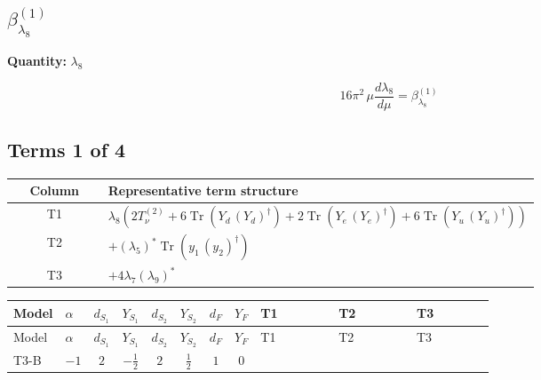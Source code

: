 \documentclass[8pt]{article}
\begin{document}
\begin{landscape}
\section*{$\beta_{\lambda_{8}}^{(1)}$}
\noindent\textbf{Quantity: }$\lambda_{8}$\par\smallskip
\[16\pi^2\,\mu\frac{d \lambda_{8}}{d\mu}=\beta_{\lambda_{8}}^{(1)}\]
\subsection*{Terms 1 of 4}
\begin{center}
\begin{tabular}{@{}c >{\raggedright\arraybackslash}p{0.82\linewidth}@{}}
\toprule
Column & Representative term structure \\
\midrule
T1 & \(\displaystyle {\lambda_{8}} (2 T_{\nu}^{(2)}+6 \operatorname{Tr}\!\left({Y_d}\,\left({Y_d}\right)^{\dagger}\right)+2 \operatorname{Tr}\!\left({Y_e}\,\left({Y_e}\right)^{\dagger}\right)+6 \operatorname{Tr}\!\left({Y_u}\,\left({Y_u}\right)^{\dagger}\right))\) \\
\midrule
T2 & \(\displaystyle +\left({\lambda_5}\right)^{*} \operatorname{Tr}\!\left({y_1}\,\left({y_2}\right)^{\dagger}\right)\) \\
\midrule
T3 & \(\displaystyle +4 {\lambda_{7}} \left({\lambda_{9}}\right)^{*}\) \\
\midrule
\bottomrule
\end{tabular}
\end{center}
\smallskip
\tiny
\begin{longtable}{@{}llcccccc >{\raggedright\arraybackslash}p{0.21\linewidth} >{\raggedright\arraybackslash}p{0.21\linewidth} >{\raggedright\arraybackslash}p{0.21\linewidth}@{}}
\toprule
Model & $\alpha$ & $d_{S_1}$ & $Y_{S_1}$ & $d_{S_2}$ & $Y_{S_2}$ & $d_F$ & $Y_F$ & T1 & T2 & T3 \\
\midrule
\endfirsthead
\toprule
Model & $\alpha$ & $d_{S_1}$ & $Y_{S_1}$ & $d_{S_2}$ & $Y_{S_2}$ & $d_F$ & $Y_F$ & T1 & T2 & T3 \\
\midrule
\endhead
T3-B & $-1$ & $2$ & $-\frac{1}{2}$ & $2$ & $\frac{1}{2}$ & $1$ & $0$ & \scriptsize\adjustbox{max width=\linewidth}{$\begin{gathered} {\lambda_{8}} (2 T_{\nu}^{(2)}+6 \operatorname{Tr}\!\left({Y_d}\,\left({Y_d}\right)^{\dagger}\right)+2 \operatorname{Tr}\!\left({Y_e}\,\left({Y_e}\right)^{\dagger}\right)+6 \operatorname{Tr}\!\left({Y_u}\,\left({Y_u}\right)^{\dagger}\right))\end{gathered}$} & \scriptsize\adjustbox{max width=\linewidth}{$\begin{gathered} +\left({\lambda_5}\right)^{*} \operatorname{Tr}\!\left({y_1}\,\left({y_2}\right)^{\dagger}\right)\end{gathered}$} & \scriptsize\adjustbox{max width=\linewidth}{$\begin{gathered} +4 {\lambda_{7}} \left({\lambda_{9}}\right)^{*}\end{gathered}$} \\

\end{longtable}
\end{landscape}
\end{document}
